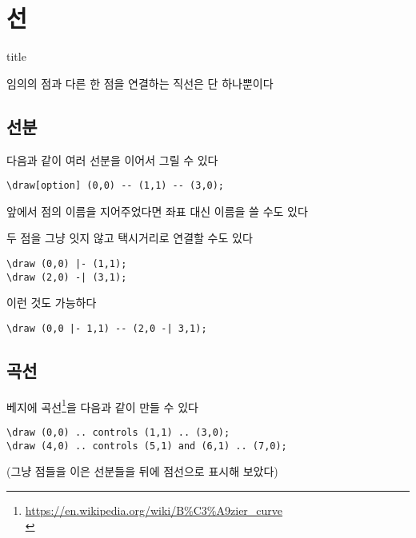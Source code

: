 \documentclass[12pt]{beamer}
\newcommand{\MyBeginSection}[1]{
	\begin{frame}
		\vfill
		\centering
		\begin{beamercolorbox}[sep=8pt,center,shadow=true,rounded=true]{title}
			\usebeamerfont{title}\insertsectionhead\par
		\end{beamercolorbox}
		\footnotesize{#1}
		\vfill
	\end{frame}
}
\begin{document}
\section{선}
\MyBeginSection{임의의 점과 다른 한 점을 연결하는 직선은 단 하나뿐이다}
\subsection{선분}
\begin{frame}[fragile]{\secname}{\subsecname}
	다음과 같이 여러 선분을 이어서 그릴 수 있다
	\begin{lstlisting}
\draw[option] (0,0) -- (1,1) -- (3,0);
	\end{lstlisting}


	\vfill
	앞에서 점의 이름을 지어주었다면 좌표 대신 이름을 쓸 수도 있다
\end{frame}
\begin{frame}[fragile]{\secname}{\subsecname}
	두 점을 그냥 잇지 않고 택시거리로 연결할 수도 있다
	\begin{lstlisting}
\draw (0,0) |- (1,1);
\draw (2,0) -| (3,1);
	\end{lstlisting}
	

\vfill
	이런 것도 가능하다
	\begin{lstlisting}
\draw (0,0 |- 1,1) -- (2,0 -| 3,1);
	\end{lstlisting}
	
\end{frame}

\subsection{곡선}
\begin{frame}[fragile]{\secname}{\subsecname}
	베지에 곡선\footnote{\url{https://en.wikipedia.org/wiki/B\%C3\%A9zier_curve}\\}을 다음과 같이 만들 수 있다
	\begin{lstlisting}
\draw (0,0) .. controls (1,1) .. (3,0); 
\draw (4,0) .. controls (5,1) and (6,1) .. (7,0);
	\end{lstlisting}
	
	\vfill
	{\footnotesize (그냥 점들을 이은 선분들을 뒤에 점선으로 표시해 보았다)}
\end{frame}
\end{document}
